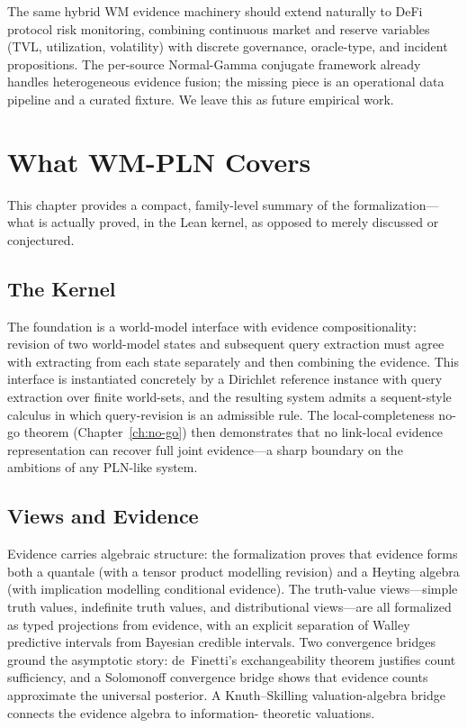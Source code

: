 \documentclass[11pt,openany]{report}
\begin{document}
The same hybrid WM evidence machinery should extend naturally to
DeFi protocol risk monitoring, combining continuous market and reserve
variables (TVL, utilization, volatility) with discrete governance,
oracle-type, and incident propositions.  The per-source
Normal-Gamma conjugate framework already handles heterogeneous
evidence fusion; the missing piece is an operational data pipeline
and a curated fixture.  We leave this as future empirical work.

\chapter{What WM-PLN Covers}
\label{ch:what-proved}

This chapter provides a compact, family-level summary of the
formalization---what is actually proved, in the Lean kernel, as opposed to
merely discussed or conjectured.

\section{The Kernel}

The foundation is a world-model interface with evidence compositionality:
revision of two world-model states and subsequent query extraction must
agree with extracting from each state separately and then combining the
evidence.  This interface is instantiated concretely by a Dirichlet
reference instance with query extraction over finite world-sets, and the
resulting system admits a sequent-style calculus in which query-revision
is an admissible rule.  The local-completeness no-go theorem
(Chapter~\ref{ch:no-go}) then demonstrates that no link-local evidence
representation can recover full joint evidence---a sharp boundary on the
ambitions of any PLN-like system.

\section{Views and Evidence}

Evidence carries algebraic structure: the formalization proves that
evidence forms both a quantale (with a tensor product modelling revision)
and a Heyting algebra (with implication modelling conditional evidence).
The truth-value views---simple truth values, indefinite truth values, and
distributional views---are all formalized as typed projections from
evidence, with an explicit separation of Walley predictive intervals from
Bayesian credible intervals.  Two convergence bridges ground the
asymptotic story: de~Finetti's exchangeability theorem justifies count
sufficiency, and a Solomonoff convergence bridge shows that evidence
counts approximate the universal posterior.  A Knuth--Skilling
valuation-algebra bridge connects the evidence algebra to information-
theoretic valuations.
\end{document}

